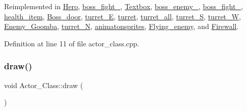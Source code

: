Reimplemented in \hyperlink{class_hero_a62d93b951b0b769c75ddbdf1615660a0}{Hero}, \hyperlink{classboss__fight__3_a48e73e4ae1484663a108df1f420b8d9e}{boss\+\_\+fight\+\_}, \hyperlink{class_textbox_a830cca6316662b4c7a1ae1d2f844f9ae}{Textbox}, \hyperlink{classboss__enemy__2_a602bdac1d534a3d37e9cd76616216b45}{boss\+\_\+enemy\+\_}, \hyperlink{classboss__fight__1_a158e53600a084e13047732d89a0f4299}{boss\+\_\+fight\+\_}, \hyperlink{classhealth__item_a9835f457ffbd1a9e157eac9423ae1201}{health\+\_\+item}, \hyperlink{class_boss__door_acee93d541699ed109dfae8f05f0ea39e}{Boss\+\_\+door}, \hyperlink{classturret___e_a7a5f3abce3a117af243be16265f84c6c}{turret\+\_\+E}, \hyperlink{classturret_a51ac1a996e5139a03f331c382d136a95}{turret}, \hyperlink{classturret__all_ae43c3ac8bb96e81158de74944fe58010}{turret\+\_\+all}, \hyperlink{classturret___s_a14320bc891a632978c4808bcb385e4b1}{turret\+\_\+S}, \hyperlink{classturret___w_a5788baf907acfcb48fc92921f514053d}{turret\+\_\+W}, \hyperlink{class_enemy___goomba_a09cd52bddf5aa44b94d85adeefa46620}{Enemy\+\_\+\+Goomba}, \hyperlink{classturret___n_a8004a2fe2a3ab77b0da93ef0e26635ce}{turret\+\_\+N}, \hyperlink{classanimatonsprites_a50c1ab6bdeb5462156197f1208d8bde5}{animatonsprites}, \hyperlink{class_flying__enemy_a79631d3c3cf673c0651be53eac8ac330}{Flying\+\_\+enemy}, and \hyperlink{class_firewall_a506013f97478b8937becdac038c45c8e}{Firewall}.



Definition at line 11 of file actor\+\_\+class.\+cpp.

\hypertarget{class_actor___class_ac49cd62be76b4b950ecbe155413f1b64}{}\label{class_actor___class_ac49cd62be76b4b950ecbe155413f1b64} 
\subsubsection{\texorpdfstring{draw()}{draw()}}
{\footnotesize\ttfamily void Actor\+\_\+\+Class\+::draw (\begin{DoxyParamCaption}{ }\end{DoxyParamCaption})\hspace{0.3cm}{\ttfamily [virtual]}}



